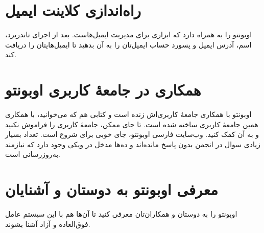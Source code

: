 \section{راه‌اندازی کلاینت ایمیل}
اوبونتو  را به همراه دارد که ابزاری برای مدیریت ایمیل‌هاست. بعد از اجرای تاندربرد، اسم، آدرس ایمیل و پسورد حساب ایمیل‌تان را به آن بدهید تا ایمیل‌هایتان را دریافت کند.

\section{همکاری در جامعهٔ کاربری اوبونتو}
اوبونتو با همکاری جامعهٔ کاربری‌اش زنده است و کتابی هم که می‌خوانید، با همکاری همین جامعهٔ کاربری ساخته شده است. تا جای ممکن، جامعهٔ کاربری را فراموش نکنید و به آن کمک کنید. وب‌سایت فارسی اوبونتو، جای خوبی برای شروع است. تعداد بسیار زیادی سوال در انجمن بدون پاسخ مانده‌اند و ده‌ها مدخل در ویکی وجود دارد که نیازمند به‌روزرسانی است.

\section{معرفی اوبونتو به دوستان و آشنایان}
اوبونتو را به دوستان و همکاران‌تان معرفی کنید تا آن‌ها هم با این سیستم عامل فوق‌العاده و آزاد آشنا بشوند.
